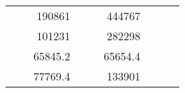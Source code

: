 \begin{table}[H]
\begin{tabular}{|ccrccrccc}
\multicolumn{1}{|c|}{\cellcolor[HTML]{FFFFC7}}                                & \multicolumn{1}{c|}{\cellcolor[HTML]{DDFDFF}}                      & \multicolumn{1}{r|}{\cellcolor[HTML]{DAE8FC}190861}    & \multicolumn{1}{c|}{\cellcolor[HTML]{FFFFC7}}                                & \multicolumn{1}{c|}{\cellcolor[HTML]{DDFDFF}}                       & \multicolumn{1}{r|}{\cellcolor[HTML]{DDFDFF}444767}    &                                                                              &                                                                    &                                                        \\ \cline{3-3} \cline{6-6}
\multicolumn{1}{|c|}{\cellcolor[HTML]{FFFFC7}}                                & \multicolumn{1}{c|}{\cellcolor[HTML]{DDFDFF}}                      & \multicolumn{1}{r|}{\cellcolor[HTML]{DDFDFF}101231}    & \multicolumn{1}{c|}{\cellcolor[HTML]{FFFFC7}}                                & \multicolumn{1}{c|}{\cellcolor[HTML]{DDFDFF}}                       & \multicolumn{1}{r|}{\cellcolor[HTML]{DAE8FC}282298}    &                                                                              &                                                                    &                                                        \\ \cline{3-3} \cline{6-6}
\multicolumn{1}{|c|}{\cellcolor[HTML]{FFFFC7}}                                & \multicolumn{1}{c|}{\cellcolor[HTML]{DDFDFF}}                      & \multicolumn{1}{r|}{\cellcolor[HTML]{DAE8FC}65845.2}   & \multicolumn{1}{c|}{\cellcolor[HTML]{FFFFC7}}                                & \multicolumn{1}{c|}{\cellcolor[HTML]{DDFDFF}}                       & \multicolumn{1}{r|}{\cellcolor[HTML]{DDFDFF}65654.4}   &                                                                              &                                                                    &                                                        \\ \cline{3-3} \cline{6-6}
\multicolumn{1}{|c|}{\cellcolor[HTML]{FFFFC7}}                                & \multicolumn{1}{c|}{\cellcolor[HTML]{DDFDFF}}                      & \multicolumn{1}{r|}{\cellcolor[HTML]{DDFDFF}77769.4}   & \multicolumn{1}{c|}{\cellcolor[HTML]{FFFFC7}}                                & \multicolumn{1}{c|}{\cellcolor[HTML]{DDFDFF}}                       & \multicolumn{1}{r|}{\cellcolor[HTML]{DAE8FC}133901}    &                                                                              &                                                                    &                                                        \\ \cline{3-3} \cline{6-6}

\end{tabular}
\end{table}
